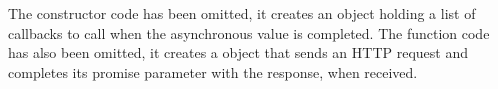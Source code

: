 \documentclass[american,english,runningheads]{llncs}
\begin{document}
The  constructor code has been omitted, it creates an object holding a list of callbacks to call when the asynchronous value is completed. The  function code has also been omitted, it creates a  object that sends an HTTP request and completes its promise parameter with the response, when received.

% 
% 
% 
% 
% 
% 
% 
%   
\end{document}
